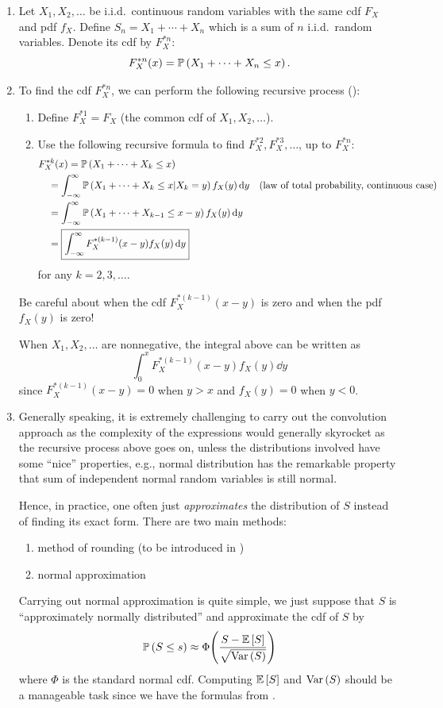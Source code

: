 \begin{enumerate}
\item Let \(X_1,X_2,\dotsc\) be i.i.d.\ continuous random variables with the
same cdf \(F_X\) and pdf \(f_X\). Define \(S_n=X_1+\dotsb+X_n\) which is a sum
of \(n\) i.i.d.\ random variables. Denote its cdf by \(F_X^{*n}\):
\[
F_{X}^{*n}(x)=\mathbb{P}\left(X_1+\dotsb+X_n\le x\right).
\]
\item \label{it:cts-convolution-steps}
To find the cdf \(F_{X}^{*n}\), we can perform the following recursive
process ():
\begin{enumerate}[label={(\arabic*)}]
\item Define \(F_{X}^{*1}=F_{X}\) (the common cdf of \(X_1,X_2,\dotsc\)).
\item Use the following recursive formula to find
\(F_X^{*2},F_X^{*3},\dotsc\), up to \(F_X^{*n}\):
\begin{align*}
&F_{X}^{*k}(x)=\mathbb{P}\left(X_1+\dotsb+X_k\le x\right)\\
&\quad=\int_{-\infty}^{\infty}\mathbb{P}\left(X_1+\dotsb+X_k\le x|X_k=y\right)f_{X}(y)\dd{y}&\text{(law of total probability, continuous case)}\\
&\quad=\int_{-\infty}^{\infty}\mathbb{P}\left(X_1+\dotsb+X_{k-1}\le x-y\right)f_{X}(y)\dd{y}\\
&\quad=\boxed{\int_{-\infty}^{\infty}F_{X}^{*(k-1)}(x-y)f_{X}(y)\dd{y}}
\end{align*}
for any \(k=2,3,\dotsc\).
\end{enumerate}
\begin{warning}
Be careful about when the cdf \(F_{X}^{*(k-1)}(x-y)\) is zero and when the pdf
\(f_X(y)\) is zero!
\end{warning}
When \(X_1,X_2,\dotsc\) are nonnegative, the integral above can be written as
\[
\int_{0}^{x}F_{X}^{*(k-1)}(x-y)f_{X}(y)\dd{y}
\]
since \(F_{X}^{*(k-1)}(x-y)=0\) when \(y>x\) and \(f_X(y)=0\) when \(y<0\).

\item Generally speaking, it is extremely challenging to carry out the
convolution approach as the complexity of the expressions would generally
skyrocket as the recursive process above goes on, unless the distributions
involved have some ``nice'' properties, e.g., normal distribution has the
remarkable property that sum of independent normal random variables is still
normal.

Hence, in practice, one often just \emph{approximates} the distribution of
\(S\) instead of finding its exact form. There are two main methods:
\begin{enumerate}
\item method of rounding (to be introduced in )
\item normal approximation
\end{enumerate}
Carrying out normal approximation is quite simple, we just suppose that \(S\)
is ``approximately normally distributed'' and approximate the cdf of \(S\) by
\[
\mathbb{P}\left(S\le s\right)\approx \Phi\qty(\frac{S-\mathbb{E}\left[S\right]}{\sqrt{\operatorname{Var}\left(S\right)}})
\]
where \(\Phi\) is the standard normal cdf. Computing \(\mathbb{E}\left[S\right]\) and
\(\operatorname{Var}\left(S\right)\) should be a manageable task since we have the formulas from
.
\end{enumerate}

